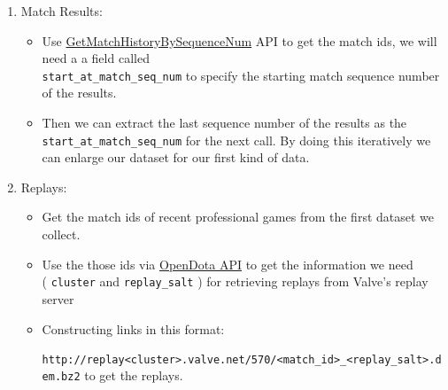 \documentclass{article}
\newcommand{\codeinline}[1]{
	\texttt{#1}
}
\begin{document}
\begin{enumerate}
\item Match Results:
	\begin{itemize}
		\item Use \href{https://wiki.teamfortress.com/wiki/WebAPI/GetMatchHistoryBySequenceNum}{GetMatchHistoryBySequenceNum} API to get the match ids, we will need a a field called \\ \codeinline{start_at_match_seq_num} to specify the starting match sequence number of the results. 
		\item Then  we can extract the last sequence number of the results as the \codeinline{start_at_match_seq_num} for the next call. By doing this iteratively we can enlarge our dataset for our first kind of data.
	\end{itemize}
\item Replays:
	\begin{itemize}
		\item Get the match ids of recent professional games from the first dataset we collect.
		\item Use the those ids via \href{https://docs.opendota.com/#tag/matches}{OpenDota API} to get the information we need \\ (\codeinline{cluster} and \codeinline{replay_salt}) for retrieving replays from Valve's replay server
		\item Constructing links in this format:\\  \codeinline{ http://replay<cluster>.valve.net/570/<match_id>_<replay_salt>.dem.bz2} to get the replays.
	\end{itemize}
\end{enumerate}
\end{document}
